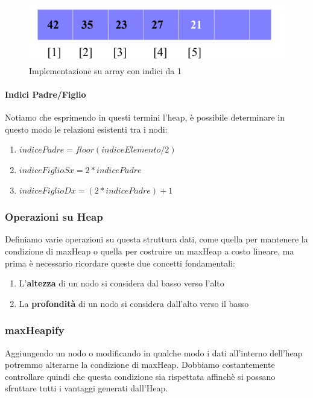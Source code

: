 \documentclass{article}
\begin{document}
\begin{figure}[htbp]
        \center
        \includegraphics[scale=0.5]{img/heap2.png}
        \caption{Implementazione su array con indici da 1}
    \end{figure}

\paragraph{Indici Padre/Figlio} Notiamo che esprimendo in questi termini l'heap, è possibile determinare in questo modo le relazioni esistenti tra i nodi:

\begin{enumerate}
    \item $indicePadre = floor(indiceElemento/2)$
    \item $indiceFiglioSx = 2*indicePadre$
    \item $indiceFiglioDx = (2*indicePadre)+1$
\end{enumerate}

\newpage

\subsubsection{Operazioni su Heap} Definiamo varie operazioni su questa struttura dati, come quella per mantenere la condizione di maxHeap o quella per costruire un maxHeap a costo lineare, ma prima è necessario ricordare queste due concetti fondamentali:

\begin{enumerate}
    \item L'\textbf{altezza} di un nodo si considera dal basso verso l'alto
    \item La \textbf{profondità} di un nodo si considera dall'alto verso il basso
\end{enumerate}

\subsubsection{maxHeapify} Aggiungendo un nodo o modificando in qualche modo i dati all'interno dell'heap potremmo alterarne la condizione di maxHeap. Dobbiamo costantemente controllare quindi che questa condizione sia rispettata affinchè si possano sfruttare tutti i vantaggi generati dall'Heap.
\end{document}
